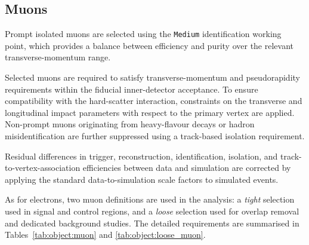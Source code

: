
\subsection{Muons}
\label{subsec:obj-muons}

Prompt isolated muons
are selected using the \texttt{Medium} identification working
point, which provides a balance between efficiency and purity
over the relevant transverse-momentum range.

Selected muons are required to satisfy transverse-momentum and
pseudorapidity requirements within the fiducial inner-detector
acceptance. To ensure compatibility with the hard-scatter
interaction, constraints on the transverse and longitudinal
impact parameters with respect to the primary vertex are applied.
Non-prompt muons originating from heavy-flavour decays or
hadron misidentification are further suppressed using a
track-based isolation requirement.

Residual differences in trigger, reconstruction, identification,
isolation, and track-to-vertex-association efficiencies between
data and simulation are corrected by applying the standard
data-to-simulation scale factors to simulated events.

As for electrons, two muon definitions are used in the analysis:
a \textit{tight} selection used in signal and control regions,
and a \textit{loose} selection used for overlap removal and
dedicated background studies. The detailed requirements are
summarised in Tables~\ref{tab:object:muon} and
\ref{tab:object:loose_muon}.

